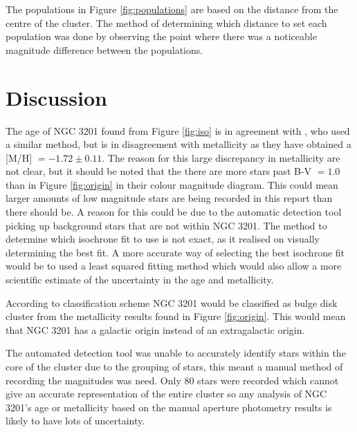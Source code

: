 \documentclass[11pt]{article}
\begin{document}
The populations in Figure \ref{fig:populations} are based on the distance from the centre of the cluster. The method of determining which distance to set each population was done by observing the point where there was a noticeable magnitude difference between the populations.

\section{Discussion}

The age of NGC 3201 found from Figure \ref{fig:iso} is in agreement with \citet{Layden_2003}, who used a similar method, but is in disagreement with metallicity as they have obtained a [M/H] $=-1.72 \pm 0.11$. The reason for this large discrepancy in metallicity are not clear, but it should be noted that the there are more stars past B-V $=1.0$ than in Figure \ref{fig:origin} in their colour magnitude diagram. This could mean larger amounts of low magnitude stars are being recorded in this report than there should be. A reason for this could be due to the automatic detection tool picking up background stars that are not within NGC 3201. The method to determine which isochrone fit to use is not exact, as it realised on visually determining the best fit. A more accurate way of selecting the best isochrone fit would be to used a least squared fitting method which would also allow a more scientific estimate of the uncertainty in the age and metallicity. 

According to \citet{Mackey} classification scheme NGC 3201 would be classified as bulge disk cluster from the metallicity results found in Figure \ref{fig:origin}. This would mean that NGC 3201 has a galactic origin instead of an extragalactic origin.

The automated detection tool was unable to accurately identify stars within the core of the cluster due to the grouping of stars, this meant a manual method of recording the magnitudes was need. Only 80 stars were recorded which cannot give an accurate representation of the entire cluster so any analysis of NGC 3201's age or metallicity based on the manual aperture photometry results is likely to have lots of uncertainty. 
\end{document}
